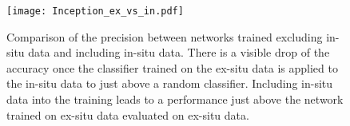 \begin{figure}
  \texttt{[image: Inception\_ex\_vs\_in.pdf]}
\caption{Comparison of the precision between networks trained excluding in-situ data and including in-situ data. There is a visible drop of the accuracy once the classifier trained on the ex-situ data is applied to the in-situ data to just above a random classifier. Including in-situ data into the training leads to a performance just above the network trained on ex-situ data evaluated on ex-situ data.}
\label{fig:Inception_ex_vs_in}
\end{figure}

%
%
%
